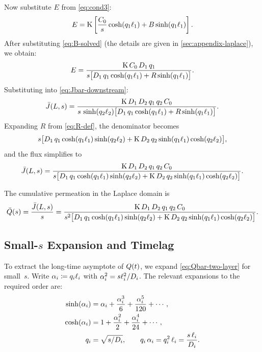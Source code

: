 Now substitute $E$ from \cref{eq:cond3}:
\begin{equation}
  E = \mathrm{K}\left[\frac{C_0}{s}\cosh(q_1\ell_{1}) + B\sinh(q_1\ell_{1})\right].
\end{equation}
After substituting \cref{eq:B-solved} (the details are given in
\cref{sec:appendix-laplace}), we obtain:
\begin{equation}
  \label{eq:E-simplified}
  E = \frac{\mathrm{K}\,C_0\,D_{1}\,q_1}
  {s\bigl[D_{1}\,q_1\cosh(q_1\ell_{1}) + R\sinh(q_1\ell_{1})\bigr]}.
\end{equation}
Substituting into \cref{eq:Jbar-downstream}:
\begin{equation}
  \label{eq:Jbar-full}
  \bar{J}(L,s)
  = \frac{\mathrm{K}\,D_{1}\,D_{2}\,q_1\,q_2\,C_0}
  {s\,\sinh(q_2\ell_{2})
    \bigl[D_{1}\,q_1\cosh(q_1\ell_{1}) + R\sinh(q_1\ell_{1})\bigr]}.
\end{equation}
Expanding $R$ from \cref{eq:R-def}, the denominator becomes
\begin{equation}
  \label{eq:denom-full}
  s\bigl[D_{1}\,q_1\cosh(q_1\ell_{1})\sinh(q_2\ell_{2})
    + \mathrm{K}\,D_{2}\,q_2\sinh(q_1\ell_{1})\cosh(q_2\ell_{2})\bigr],
\end{equation}
and the flux simplifies to
\begin{equation}
  \label{eq:Jbar-clean}
  \bar{J}(L,s) = \frac{\mathrm{K}\,D_{1}\,D_{2}\,q_1\,q_2\,C_0}
  {s\bigl[D_{1}\,q_1\cosh(q_1\ell_{1})\sinh(q_2\ell_{2})
    + \mathrm{K}\,D_{2}\,q_2\sinh(q_1\ell_{1})\cosh(q_2\ell_{2})\bigr]}.
\end{equation}

The cumulative permeation in the Laplace domain is
\begin{equation}
  \label{eq:Qbar-two-layer}
  \bar{Q}(s) = \frac{\bar{J}(L,s)}{s}
  = \frac{\mathrm{K}\,D_{1}\,D_{2}\,q_1\,q_2\,C_0}
  {s^2\bigl[D_{1}\,q_1\cosh(q_1\ell_{1})\sinh(q_2\ell_{2})
    + \mathrm{K}\,D_{2}\,q_2\sinh(q_1\ell_{1})\cosh(q_2\ell_{2})\bigr]}.
\end{equation}

\subsection{Small-\texorpdfstring{$s$}{s} Expansion and Timelag}
\label{sec:two-layer-smalls}

To extract the long-time asymptote of $Q(t)$, we expand
\cref{eq:Qbar-two-layer} for small~$s$.  Write $\alpha_i \coloneqq q_i\ell_{i}$
with $\alpha_i^2 = s\ell_{i}^2/D_{i}$.  The relevant expansions to the
required order are:
\begin{align}
  \label{eq:sinh-expand}
  \sinh(\alpha_i) &= \alpha_i + \frac{\alpha_i^3}{6}
    + \frac{\alpha_i^5}{120} + \cdots, \\
  \label{eq:cosh-expand}
  \cosh(\alpha_i) &= 1 + \frac{\alpha_i^2}{2}
    + \frac{\alpha_i^4}{24} + \cdots,\\
  q_i &= \sqrt{s/D_{i}}, \qquad
  q_i\,\alpha_i = q_i^2\,\ell_{i} = \frac{s\,\ell_{i}}{D_{i}}.
\end{align}

